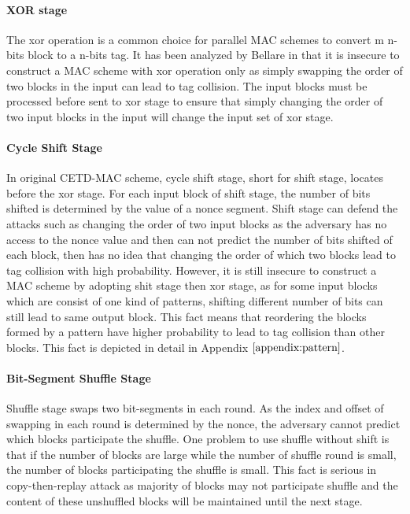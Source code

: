 \paragraph{XOR stage}
The xor operation is a common choice for parallel MAC schemes to convert m n-bits block to a n-bits tag. It has been analyzed by Bellare in \cite{} that it is insecure to construct a MAC scheme with xor operation only as simply swapping the order of two blocks in the input can lead to tag collision.  The input blocks must be processed before sent to xor stage to ensure that simply changing the order of two input blocks in the input will change the input set of xor stage.
\paragraph{Cycle Shift Stage}
In original CETD-MAC scheme, cycle shift stage, short for shift stage, locates before the xor stage. For each input block of shift stage, the number of bits shifted is determined by the value of a nonce segment. Shift stage can defend the attacks such as changing the order of two input blocks as the adversary has no access to the nonce value and then can not predict the number of bits shifted of each block, then has no idea that changing the order of which two blocks lead to tag collision with high probability. However, it is still insecure to construct a MAC scheme by adopting shit stage then xor stage, as for some input blocks which are consist of one kind of patterns, shifting different number of bits can still lead to same output block. This fact means that reordering the blocks formed by a pattern have higher probability to lead to tag collision than other blocks. This fact is depicted in detail in Appendix $\ref{appendix:pattern}$. 

\paragraph{Bit-Segment Shuffle Stage}
Shuffle stage swaps two bit-segments in each round. As the index and offset of swapping in each round is determined by the nonce, the adversary cannot predict which blocks participate the shuffle. One problem to use shuffle without shift is that if the number of blocks are large while the number of shuffle round is small, the number of blocks participating the shuffle is small. This fact is serious in copy-then-replay attack as majority of blocks may not participate shuffle and the content of these unshuffled blocks will be maintained until the next stage. %

